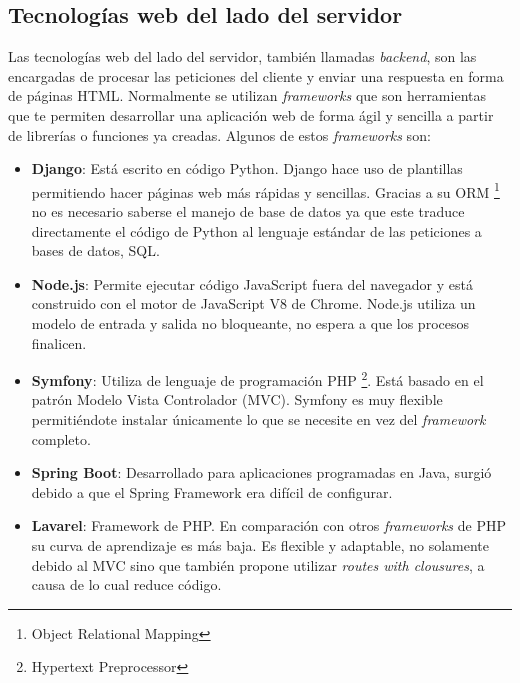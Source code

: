 \subsection{Tecnologías web del lado del servidor}
Las tecnologías web del lado del servidor, también llamadas \textit{backend}, son las encargadas de procesar las peticiones del cliente y enviar una respuesta en forma de páginas HTML. Normalmente se utilizan \textit{frameworks }que son herramientas que te permiten desarrollar una aplicación web de forma ágil y sencilla a partir de librerías o funciones ya creadas. Algunos de estos \textit{frameworks} son:

\begin{itemize}
  \item \textbf{Django}: Está escrito en código Python. Django hace uso de plantillas permitiendo hacer páginas web más rápidas y sencillas. Gracias a su ORM \footnote{Object Relational Mapping} no es necesario saberse el manejo de base de datos ya que este traduce directamente el código de Python al lenguaje estándar de las peticiones a bases de datos, SQL.
  \item \textbf{Node.js}: Permite ejecutar código JavaScript fuera del navegador y está construido con el motor de JavaScript V8 de Chrome. Node.js utiliza un modelo de entrada y salida no bloqueante, no espera a que los procesos finalicen.
  \item \textbf{Symfony}: Utiliza de lenguaje de programación PHP \footnote{Hypertext Preprocessor}. Está basado en el patrón Modelo Vista Controlador (MVC). Symfony es muy flexible permitiéndote instalar únicamente lo que se necesite en vez del \textit{framework} completo.
  \item \textbf{Spring Boot}: Desarrollado para aplicaciones programadas en Java, surgió debido a que el Spring Framework era difícil de configurar. 
\item \textbf{Lavarel}: Framework de PHP. En comparación con otros \textit{frameworks } de PHP su curva de aprendizaje es más baja. Es flexible y adaptable, no solamente debido al MVC sino que también propone utilizar \textit{routes with clousures}, a causa de lo cual reduce código.\cite{lavarel}
\end{itemize}
\newpage
